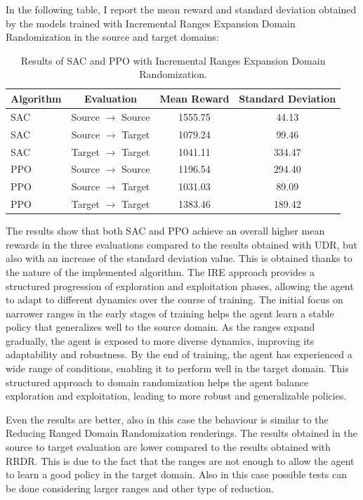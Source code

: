 \documentclass[12pt]{article}
\begin{document}
In the following table, I report the mean reward and standard deviation obtained by the models trained with Incremental Ranges Expansion Domain Randomization in the source and target domains:

\begin{table}[H]
    \centering
    \begin{tabular}{|l|c|c|c|}
        \hline
        \textbf{Algorithm} & \textbf{Evaluation} & \textbf{Mean Reward} & \textbf{Standard Deviation} \\ \hline
        SAC & Source $\rightarrow$ Source & 1555.75 & 44.13 \\ 
        SAC & Source $\rightarrow$ Target & 1079.24 & 99.46 \\ 
        SAC & Target $\rightarrow$ Target & 1041.11 & 334.47 \\ \hline
        PPO & Source $\rightarrow$ Source & 1196.54 & 294.40 \\ 
        PPO & Source $\rightarrow$ Target & 1031.03 & 89.09 \\ 
        PPO & Target $\rightarrow$ Target & 1383.46 & 189.42 \\ \hline
    \end{tabular}
    \caption{Results of SAC and PPO with Incremental Ranges Expansion Domain Randomization.}
    \label{tab:results_ire}
\end{table}

The results show that both SAC and PPO achieve an overall higher mean rewards in the three evaluations compared to the results obtained with UDR, but also with an increase of the standard deviation value. This is obtained thanks to the nature of the implemented algorithm. The IRE approach provides a structured progression of exploration and exploitation phases, allowing the agent to adapt to different dynamics over the course of training. The initial focus on narrower ranges in the early stages of training helps the agent learn a stable policy that generalizes well to the source domain. As the ranges expand gradually, the agent is exposed to more diverse dynamics, improving its adaptability and robustness. By the end of training, the agent has experienced a wide range of conditions, enabling it to perform well in the target domain. This structured approach to domain randomization helps the agent balance exploration and exploitation, leading to more robust and generalizable policies.

Even the results are better, also in this case the behaviour is similar to the Reducing Ranged Domain Randomization renderings. The results obtained in the source to target evaluation are lower compared to the results obtained with RRDR. This is due to the fact that the ranges are not enough to allow the agent to learn a good policy in the target domain. Also in this case possible tests can be done considering larger ranges and other type of reduction. 
\end{document}
